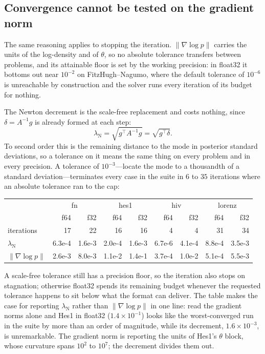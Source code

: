 \documentclass[11pt]{article}
\theoremstyle{plain}
\theoremstyle{definition}
\theoremstyle{remark}
\begin{document}
\subsection{Convergence cannot be tested on the gradient norm}
\label{sec:decrement}

The same reasoning applies to stopping the iteration. $\|\nabla\log p\|$ carries the units of the
log-density and of $\theta$, so no absolute tolerance transfers between problems, and its
attainable floor is set by the working precision: in float32 it bottoms out near $10^{-2}$ on
FitzHugh--Nagumo, where the default tolerance of $10^{-6}$ is unreachable by construction and the
solver runs every iteration of its budget for nothing.

The Newton decrement is the scale-free replacement and costs nothing, since $\delta = A^{-1}g$ is
already formed at each step:
\begin{equation}
\label{eq:decrement}
  \lambda_{\mathrm{N}} = \sqrt{g^\top A^{-1} g} = \sqrt{g^\top \delta}.
\end{equation}
To second order this is the remaining distance to the mode in posterior standard deviations, so a
tolerance on it means the same thing on every problem and in every precision. A tolerance of
$10^{-3}$---locate the mode to a thousandth of a standard deviation---terminates every case in the
suite in $6$ to $35$ iterations where an absolute tolerance ran to the cap:

\begin{center}\small
\begin{tabular}{lrrrrrrrr}
\toprule
& \multicolumn{2}{c}{fn} & \multicolumn{2}{c}{hes1} & \multicolumn{2}{c}{hiv} & \multicolumn{2}{c}{lorenz}\\
& f64 & f32 & f64 & f32 & f64 & f32 & f64 & f32\\
\midrule
iterations & 17 & 22 & 16 & 16 & 4 & 4 & 31 & 34\\
$\lambda_{\mathrm{N}}$ & 6.3e-4 & 1.6e-3 & 2.0e-4 & 1.6e-3 & 6.7e-6 & 4.1e-4 & 8.8e-4 & 3.5e-3\\
$\|\nabla\log p\|$ & 2.6e-3 & 8.0e-3 & 1.1e-2 & 1.4e-1 & 3.7e-4 & 1.0e-2 & 5.1e-4 & 5.5e-3\\
\bottomrule
\end{tabular}
\end{center}

A scale-free tolerance still has a precision floor, so the iteration also stops on stagnation;
otherwise float32 spends its remaining budget whenever the requested tolerance happens to sit
below what the format can deliver. The table makes the case for reporting $\lambda_{\mathrm{N}}$
rather than $\|\nabla\log p\|$ in one line: read the gradient norms alone and Hes1 in float32
($1.4\times10^{-1}$) looks like the worst-converged run in the suite by more than an order of
magnitude, while its decrement, $1.6\times10^{-3}$, is unremarkable. The gradient norm is reporting the
units of Hes1's $\theta$ block, whose curvature spans $10^{2}$ to $10^{7}$; the decrement divides
them out.
\end{document}
